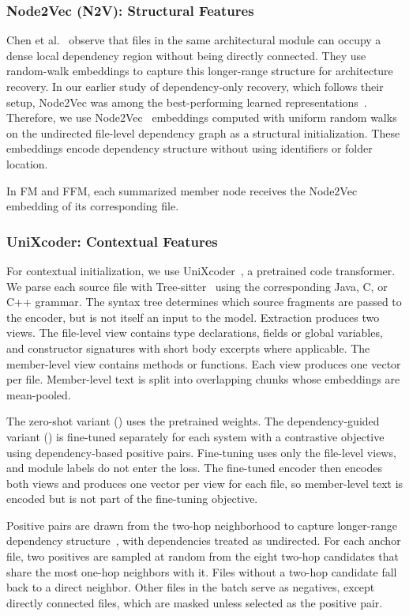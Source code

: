 \subsubsection{Node2Vec (N2V): Structural Features \label{sec:node_n2v}}
Chen et al.~\citep{negar} observe that files in the same architectural module can occupy a dense local dependency region without being directly connected. They use random-walk embeddings to capture this longer-range structure for architecture recovery. In our earlier study of dependency-only recovery, which follows their setup, Node2Vec was among the best-performing learned representations~\cite{structsar}. Therefore, we use Node2Vec~\cite{node2vec} embeddings computed with uniform random walks on the undirected file-level dependency graph as a structural initialization. These embeddings encode dependency structure without using identifiers or folder location.

In FM and FFM, each summarized member node receives the Node2Vec embedding of its corresponding file.
 
\subsubsection{UniXcoder: Contextual Features \label{sec:unixcoder}}
For contextual initialization, we use UniXcoder~\cite{unixcoder}, a pretrained code transformer. We parse each source file with Tree-sitter~\cite{tree_sitter} using the corresponding Java, C, or C++ grammar. The syntax tree determines which source fragments are passed to the encoder, but is not itself an input to the model. Extraction produces two views. The file-level view contains type declarations, fields or global variables, and constructor signatures with short body excerpts where applicable. The member-level view contains methods or functions. Each view produces one vector per file. Member-level text is split into overlapping chunks whose embeddings are mean-pooled.
 
The zero-shot variant (\zs{}) uses the pretrained weights. The dependency-guided variant (\ft{}) is fine-tuned separately for each system with a contrastive objective~\cite{infonce} using dependency-based positive pairs. Fine-tuning uses only the file-level views, and module labels do not enter the loss. The fine-tuned encoder then encodes both views and produces one vector per view for each file, so member-level text is encoded but is not part of the fine-tuning objective.
 
Positive pairs are drawn from the two-hop neighborhood to capture longer-range dependency structure~\cite{structsar}, with dependencies treated as undirected. For each anchor file, two positives are sampled at random from the eight two-hop candidates that share the most one-hop neighbors with it. Files without a two-hop candidate fall back to a direct neighbor. Other files in the batch serve as negatives, except directly connected files, which are masked unless selected as the positive pair.
